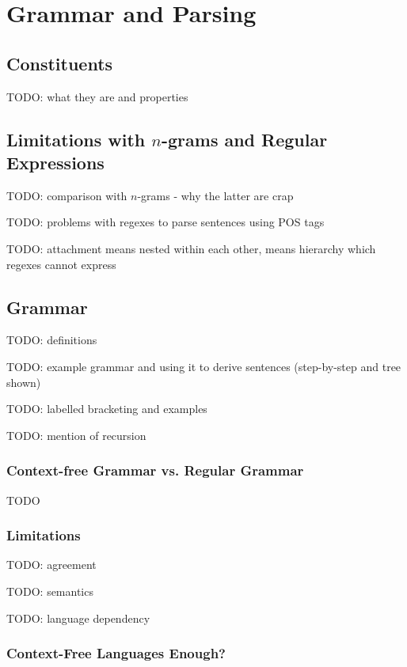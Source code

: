 \documentclass{article}
\begin{document}
\section{Grammar and Parsing}

\subsection{Constituents}

TODO: what they are and properties

\subsection{Limitations with $n$-grams and Regular Expressions}

TODO: comparison with $n$-grams - why the latter are crap

TODO: problems with regexes to parse sentences using POS tags

TODO: attachment means nested within each other, means hierarchy which regexes cannot express

\subsection{Grammar}

TODO: definitions

TODO: example grammar and using it to derive sentences (step-by-step and tree shown)

TODO: labelled bracketing and examples

TODO: mention of recursion

\subsubsection{Context-free Grammar vs. Regular Grammar}

TODO

\subsubsection{Limitations}

TODO: agreement

TODO: semantics

TODO: language dependency

\subsubsection{Context-Free Languages Enough?}
\end{document}
